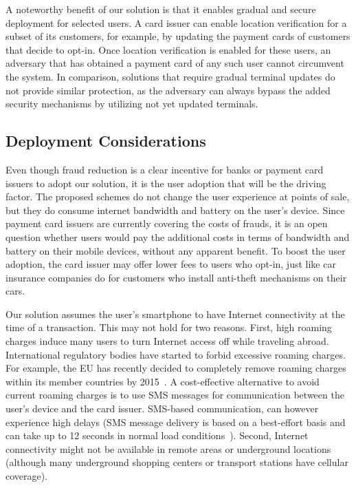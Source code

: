 A noteworthy benefit of our solution is that it enables gradual and secure
deployment for selected users. A card issuer can enable location verification
for a subset of its customers, for example, by updating the payment cards of
customers that decide to opt-in. Once location verification is enabled for these
users, an adversary that has obtained a payment card of any such user cannot
circumvent the system. In comparison, solutions that require gradual terminal
updates do not provide similar protection, as the adversary can always bypass
the added security mechanisms by utilizing not yet updated terminals.

\subsection{Deployment Considerations}

Even though fraud reduction is a clear incentive for banks or payment card
issuers to adopt our solution, it is the user adoption that will be the driving
factor. The proposed schemes do not change the user experience at points of
sale, but they do consume internet bandwidth and battery on the user's
device. Since payment card issuers are currently covering the costs of frauds,
it is an open question whether users would pay the additional costs in terms of
bandwidth and battery on their mobile devices, without any apparent benefit. To
boost the user adoption, the card issuer may offer lower fees to users who
opt-in, just like car insurance companies do for customers who install
anti-theft mechanisms on their cars.

Our solution assumes the user's smartphone to have Internet connectivity at the
time of a transaction.  This may not hold for two reasons.  First, high roaming
charges induce many users to turn Internet access off while traveling abroad.
International regulatory bodies have started to forbid excessive roaming
charges.  For example, the EU has recently decided to completely remove roaming
charges within its member countries by 2015~\cite{telegraph2013roaming}.  A
cost-effective alternative to avoid current roaming charges is to use SMS
messages for communication between the user's device and the card issuer.
SMS-based communication, can however experience high delays (SMS message
delivery is based on a best-effort basis and can take up to 12 seconds in normal
load conditions~\cite{smsdelay}). Second, Internet connectivity might not be
available in remote areas or underground locations (although many underground
shopping centers or transport stations have cellular coverage).

